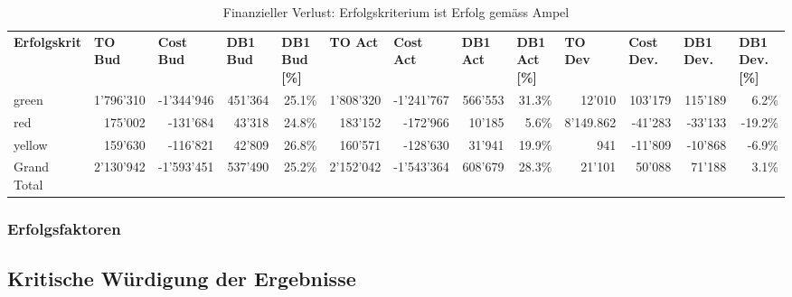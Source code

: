 \begin{table}[htbp]
	\centering
	\caption{Finanzieller Verlust: Erfolgskriterium ist Erfolg gemäss Ampel}
	\begin{tabular}{lrrrrrrrrrrrr}
		\textbf{Erfolgskrit} & \multicolumn{1}{l}{\textbf{TO Bud}} & \multicolumn{1}{l}{\textbf{Cost Bud}} & \multicolumn{1}{l}{\textbf{DB1 Bud}} & \multicolumn{1}{l}{\textbf{DB1 Bud [\%]}} & \multicolumn{1}{l}{\textbf{TO Act}} & \multicolumn{1}{l}{\textbf{Cost Act}} & \multicolumn{1}{l}{\textbf{DB1 Act}} & \multicolumn{1}{l}{\textbf{DB1 Act [\%]}} & \multicolumn{1}{l}{\textbf{TO Dev}} & \multicolumn{1}{l}{\textbf{Cost Dev.}} & \multicolumn{1}{l}{\textbf{DB1 Dev.}} & \multicolumn{1}{l}{\textbf{DB1 Dev. [\%]}} \\
		green & 1'796'310 & -1'344'946 & 451'364 & 25.1\% & 1'808'320 & -1'241'767 & 566'553 & 31.3\% & 12'010 & 103'179 & 115'189 & 6.2\% \\
		red   & 175'002 & -131'684 & 43'318 & 24.8\% & 183'152 & -172'966 & 10'185 & 5.6\% & 8'149.862 & -41'283 & -33'133 & -19.2\% \\
		yellow & 159'630 & -116'821 & 42'809 & 26.8\% & 160'571 & -128'630 & 31'941 & 19.9\% & 941   & -11'809 & -10'868 & -6.9\% \\
		Grand Total & 2'130'942 & -1'593'451 & 537'490 & 25.2\% & 2'152'042 & -1'543'364 & 608'679 & 28.3\% & 21'101 & 50'088 & 71'188 & 3.1\% \\
	\end{tabular}%
	\label{tab:addlabel}%
\end{table}%
\newline\newline


\subsubsection{Erfolgsfaktoren}
\subsection{Kritische Würdigung der Ergebnisse}
\newpage	
	


